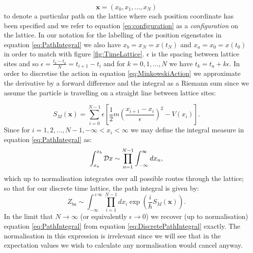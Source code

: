 \documentclass[12pt]{article}
\begin{document}
        \begin{equation}
            \label{eq:configuration}
            \bm{x}=\left(x_0,x_1,\dots,x_{N}\right)
        \end{equation}
        to denote a particular path on the lattice where each position coordinate has been specified and we refer to equation \ref{eq:configuration} as a \textit{configuration} on the lattice. In our notation for the labelling of the position eigenstates in equation \ref{eq:PathIntegral} we also have $x_b=x_{N}=x\left(t_{N}\right)$ and $x_a=x_0=x\left(t_0\right)$ in order to match with figure \ref{fig:TimeLattice}. $ \epsilon $ is the spacing between lattice sites and so $\epsilon = \frac{t_b-t_a}{N} = t_{i+1}-t_i$ and for $k=0,1,\dots,N$ we have $ t_k = t_a + k \epsilon $. In order to discretise the action in equation \ref{eq:MinkowskiAction} we approximate the derivative by a forward difference and the integral as a Riemann sum since we assume the particle is travelling on a straight line between lattice sites:
        
        \begin{equation}
            \label{eq:DiscreteMinkowskiAction}
            S_{M}\left(\bm{x}\right) = \sum_{i=0}^{N-1} \epsilon \left[\frac{1}{2}m\left(\frac{x_{i+1}-x_{i}}{\epsilon}\right)^{2} - V\left(x_i\right)\right].
        \end{equation}
        Since  for $i=1,2,\dots,N-1, -\infty < x_i < \infty$ we may define the integral measure in equation \ref{eq:PathIntegral} as:
        \begin{equation}
            \label{eq:IntegralMeasure}
            \int_{x_a}^{x_b} {\cal D} x \sim \prod_{n=1}^{N-1}\int_{-\infty}^{\infty}dx_n,
        \end{equation}
        which up to normalisation integrates over all possible routes through the lattice; so that for our discrete time lattice, the path integral is given by:
        \begin{equation}
            \label{eq:DiscretePathIntegral}
            Z_{ba} \sim \int^{+\infty}_{-\infty}\prod_{i=1}^{N-1}dx_i \exp{\left(\frac{i}{\hbar}S_M\left(\bm{x}\right)\right)}.
        \end{equation}
        In the limit that $N\rightarrow \infty$ (or equivalently $\epsilon \rightarrow 0$) we recover (up to normalisation) equation \ref{eq:PathIntegral} from equation \ref{eq:DiscretePathIntegral} exactly. The normalisation in this expression is irrelevant since we will see that in the expectation values we wish to calculate any normalisation would cancel anyway.  
\end{document}
